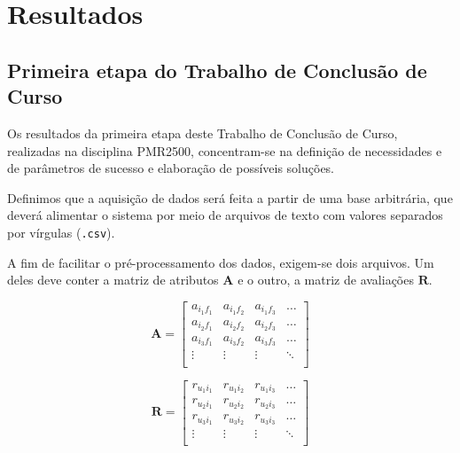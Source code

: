 \chapter[Resultados]{Resultados}
\label{chap:resultados}

\section{Primeira etapa do Trabalho de Conclusão de Curso} %
\label{sec:primeira_etapa_do_trabalho_de_conclus_o_de_curso}

Os resultados da primeira etapa deste Trabalho de Conclusão de Curso, realizadas na disciplina PMR2500, concentram-se na definição de necessidades e de parâmetros de sucesso e elaboração de possíveis soluções. 

Definimos que a aquisição de dados será feita a partir de uma base arbitrária, que deverá alimentar o sistema por meio de arquivos de texto com valores separados por vírgulas (\texttt{.csv}).

A fim de facilitar o pré-processamento dos dados, exigem-se dois arquivos. Um deles deve conter a matriz de atributos $\mathbf{A}$ e o outro, a matriz de avaliações  $\mathbf{R}$. 

\begin{equation} 
\mathbf{A} = 
\begin{bmatrix} 
 a_{i_1 f_1} &  a_{i_1 f_2} &  a_{i_1 f_3}  & \dots   \\
 a_{i_2 f_1} &  a_{i_2 f_2} &  a_{i_2 f_3}  & \dots   \\
 a_{i_3 f_1} &  a_{i_3 f_2} &  a_{i_3 f_3}  & \dots  \\ 
 \vdots &  \vdots &  \vdots  & \ddots   \\
 \end{bmatrix}
\end{equation}


\begin{equation}
	  \mathbf{R} = 
\begin{bmatrix} 
  r_{u_1 i_1} &  r_{u_1 i_2} &  r_{u_1 i_3}  & \dots   \\
 r_{u_2 i_1} &  r_{u_2 i_2} &  r_{u_2 i_3}  & \dots   \\
 r_{u_3 i_1} &  r_{u_3 i_2} &  r_{u_3 i_3}  & \dots  \\ 
 \vdots &  \vdots &  \vdots  & \ddots   \\
\end{bmatrix}
\end{equation}

